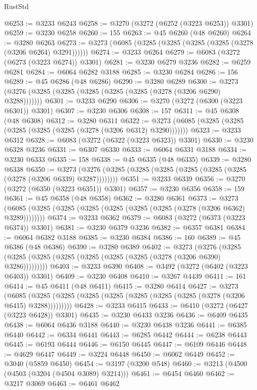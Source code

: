\begin{lexlean}{RustStd}
\begin{coremodule}
@6253 := @3233 @6243
@6258 := @3270 (@3272 (@6252 (@3223 @6253)) @3301)
@6259 := @3230 @6258
@6260 := 155
@6263 := @45 @6260 (@48 @6260)
@6264 := @3280 @6263
@6273 := @3273 (@6085 (@3285 (@3285 (@3285 (@3285 (@3278 (@3206 @6264) @3291))))))
@6274 := @3233 @6264
@6279 := @6083 (@3272 (@6273 (@3223 @6274)) @3301)
@6281 := @3230 @6279 @3236
@6282 := @6259 @6281
@6284 := @6064 @6282 @3188
@6285 := @3230 @6284
@6286 := 156
@6289 := @45 @6286 (@48 @6286)
@6290 := @3280 @6289
@6300 := @3273 (@3276 (@3285 (@3285 (@3285 (@3285 (@3285 (@3278 (@3206 @6290) @3288)))))))
@6301 := @3233 @6290
@6306 := @3270 (@3272 (@6300 (@3223 @6301)) @3301)
@6307 := @3230 @6306
@6308 := 157
@6311 := @45 @6308 (@48 @6308)
@6312 := @3280 @6311
@6322 := @3273 (@6085 (@3285 (@3285 (@3285 (@3285 (@3285 (@3278 (@3206 @6312) @3290)))))))
@6323 := @3233 @6312
@6328 := @6083 (@3272 (@6322 (@3223 @6323)) @3301)
@6330 := @3230 @6328 @3236
@6331 := @6307 @6330
@6333 := @6064 @6331 @3188
@6334 := @3230 @6333
@6335 := 158
@6338 := @45 @6335 (@48 @6335)
@6339 := @3280 @6338
@6350 := @3273 (@3276 (@3285 (@3285 (@3285 (@3285 (@3285 (@3285 (@3278 (@3206 @6339) @3287))))))))
@6351 := @3233 @6339
@6356 := @3270 (@3272 (@6350 (@3223 @6351)) @3301)
@6357 := @3230 @6356
@6358 := 159
@6361 := @45 @6358 (@48 @6358)
@6362 := @3280 @6361
@6373 := @3273 (@6085 (@3285 (@3285 (@3285 (@3285 (@3285 (@3285 (@3278 (@3206 @6362) @3289))))))))
@6374 := @3233 @6362
@6379 := @6083 (@3272 (@6373 (@3223 @6374)) @3301)
@6381 := @3230 @6379 @3236
@6382 := @6357 @6381
@6384 := @6064 @6382 @3188
@6385 := @3230 @6384
@6386 := 160
@6389 := @45 @6386 (@48 @6386)
@6390 := @3280 @6389
@6402 := @3273
    (@3276 (@3285 (@3285 (@3285 (@3285 (@3285 (@3285 (@3285 (@3278 (@3206 @6390) @3286)))))))))
@6403 := @3233 @6390
@6408 := @3492 (@3272 (@6402 (@3223 @6403)) @3301)
@6409 := @3230 @6408
@6410 := @3267 @4439
@6411 := 161
@6414 := @45 @6411 (@48 @6411)
@6415 := @3280 @6414
@6427 := @3273
    (@6085 (@3285 (@3285 (@3285 (@3285 (@3285 (@3285 (@3285 (@3278 (@3206 @6415) @3288)))))))))
@6428 := @3233 @6415
@6433 := @6410 (@3272 (@6427 (@3223 @6428)) @3301)
@6435 := @3230 @6433 @3236
@6436 := @6409 @6435
@6438 := @6064 @6436 @3188
@6440 := @3230 @6438 @3236
@6441 := @6385 @6440
@6442 := @6334 @6441
@6443 := @6285 @6442
@6444 := @6238 @6443
@6445 := @6193 @6444
@6446 := @6150 @6445
@6447 := @6109 @6446
@6448 := @4629 @6447
@6449 := @3224 @6448
@6450 := @6062 @6449
@6452 := @3040 (@5859 @6450)
@6454 := @3197 (@3200 @548)
@6460 := @3213 (@4500 (@4503 (@3204 (@4504 @3089) @3214)))
@6461 := @6454 @6460
@6462 := @3217 @3069
@6463 := @6461 @6462

\end{coremodule}
\end{lexlean}
